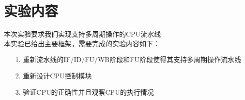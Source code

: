 
\section{实验内容}
本次实验要求我们实现支持多周期操作的CPU流水线 \\
本实验已给出主要框架，需要完成的实验内容如下：
\begin{itemize}
    \item [1.] 重新流水线的IF/ID/FU/WB阶段和FU阶段使得其支持多周期操作流水线
    \item [2.] 重新设计CPU控制模块
    \item [3.] 验证CPU的正确性并且观察CPU的执行情况
\end{itemize}  